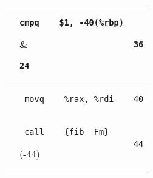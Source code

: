 \documentclass{ti2}
\begin{document}
\begin{tabular}{ | l | l | l|}
\begin{lstlisting}
\end{lstlisting} &
\begin{lstlisting}
cmpq    $1, -40(%rbp)
\end{lstlisting} &
\begin{lstlisting}
24
\end{lstlisting} \\ \hline

\begin{lstlisting}
\end{lstlisting} &
\begin{lstlisting}
 jbe     {.L2}
\end{lstlisting} \color{blue}(+52) &
\begin{lstlisting}
28
\end{lstlisting} \\ \hline

\begin{lstlisting}
\end{lstlisting} &
\begin{lstlisting}
 movq    -40(%rbp), %rax
\end{lstlisting} &
\begin{lstlisting}
32
\end{lstlisting} \\ \hline

\begin{lstlisting}
\end{lstlisting} &
\begin{lstlisting}
 subq    $2, %rax
\end{lstlisting} &
\begin{lstlisting}
36
\end{lstlisting} \\ \hline

\begin{lstlisting}
\end{lstlisting} &
\begin{lstlisting}
 movq    %rax, %rdi
\end{lstlisting} &
\begin{lstlisting}
40
\end{lstlisting} \\ \hline

\begin{lstlisting}
\end{lstlisting} &
\begin{lstlisting}
 call    {fib__Fm}
\end{lstlisting} \color{red}(-44) &
\begin{lstlisting}
44
\end{lstlisting} \\ \hline


\end{tabular}
\end{document}

